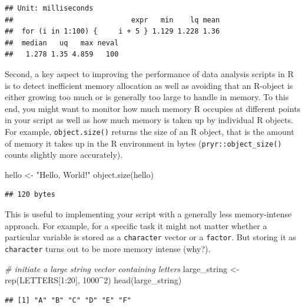 \documentclass[
  12pt,
]{style/krantz}
\newenvironment{Shaded}{\begin{snugshade}}{\end{snugshade}}
\newcommand{\CommentTok}[1]{\textcolor[rgb]{0.56,0.35,0.01}{\textit{#1}}}
\newcommand{\DecValTok}[1]{\textcolor[rgb]{0.00,0.00,0.81}{#1}}
\newcommand{\FunctionTok}[1]{\textcolor[rgb]{0.00,0.00,0.00}{#1}}
\newcommand{\NormalTok}[1]{#1}
\newcommand{\OtherTok}[1]{\textcolor[rgb]{0.56,0.35,0.01}{#1}}
\newcommand{\SpecialCharTok}[1]{\textcolor[rgb]{0.00,0.00,0.00}{#1}}
\newcommand{\StringTok}[1]{\textcolor[rgb]{0.31,0.60,0.02}{#1}}
\begin{document}
\begin{verbatim}
## Unit: milliseconds
##                            expr   min    lq mean
##  for (i in 1:100) {     i + 5 } 1.129 1.228 1.36
##  median   uq   max neval
##   1.278 1.35 4.859   100
\end{verbatim}

Second, a key aspect to improving the performance of data analysis scripts in R is to detect inefficient memory allocation as well as avoiding that an R-object is either growing too much or is generally too large to handle in memory. To this end, you might want to monitor how much memory R occupies at different points in your script as well as how much memory is taken up by individual R objects. For example, \texttt{object.size()} returns the size of an R object, that is the amount of memory it takes up in the R environment in bytes (\texttt{pryr::object\_size()} counts slightly more accurately).

\begin{Shaded}
\begin{Highlighting}[]
\NormalTok{hello }\OtherTok{\textless{}{-}} \StringTok{"Hello, World!"}
\FunctionTok{object.size}\NormalTok{(hello)}
\end{Highlighting}
\end{Shaded}

\begin{verbatim}
## 120 bytes
\end{verbatim}

This is useful to implementing your script with a generally less memory-intense approach. For example, for a specific task it might not matter whether a particular variable is stored as a \texttt{character} vector or a \texttt{factor}. But storing it as \texttt{character} turns out to be more memory intense (why?).

\begin{Shaded}
\begin{Highlighting}[]
\CommentTok{\# initiate a large string vector containing letters}
\NormalTok{large\_string }\OtherTok{\textless{}{-}} \FunctionTok{rep}\NormalTok{(LETTERS[}\DecValTok{1}\SpecialCharTok{:}\DecValTok{20}\NormalTok{], }\DecValTok{1000}\SpecialCharTok{\^{}}\DecValTok{2}\NormalTok{)}
\FunctionTok{head}\NormalTok{(large\_string)}
\end{Highlighting}
\end{Shaded}

\begin{verbatim}
## [1] "A" "B" "C" "D" "E" "F"
\end{verbatim}
\end{document}
